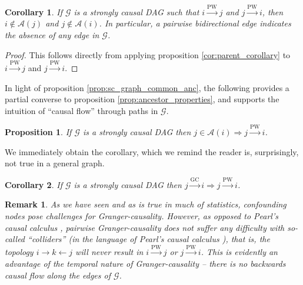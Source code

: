 \documentclass{statsoc}
\def\gc{\overset{\text{GC}}{\rightarrow}}  %
\def\pwgc{\overset{\text{PW}}{\rightarrow}}  %
\def\gcg{\mathcal{G}}  %
\newcommand{\pa}[1]{pa(#1)}  %
\newcommand{\anc}[1]{\mathcal{A}(#1)}  %
\newtheorem{corollary}{Corollary}
\newtheorem{proposition}{Proposition}
\newtheorem{remark}{Remark}
\begin{document}
\begin{corollary}
  \label{cor:bidirectional_edge}
  If $\gcg$ is a strongly causal DAG such that $i \pwgc j$ and
  $j \pwgc i$, then $i \not\in \anc{j}$ and $j \not\in \anc{i}$.  In
  particular, a pairwise bidirectional edge indicates the absence of
  any edge in $\gcg$.
\end{corollary}
\begin{proof}
  This follows directly from applying proposition
  \ref{cor:parent_corollary} to $i \pwgc j$ and $j \pwgc i$.
\end{proof}

In light of proposition \ref{prop:sc_graph_common_anc}, the following
provides a partial converse to proposition
\ref{prop:ancestor_properties}, and supports the intuition of ``causal
flow'' through paths in $\gcg$.

\begin{proposition}
  \label{prop:pwgc_anc}
  If $\gcg$ is a strongly causal DAG then $j \in \anc{i} \Rightarrow j \pwgc i$.
\end{proposition}

We immediately obtain the corollary, which we remind the reader is,
surprisingly, not true in a general graph.

\begin{corollary}
  \label{cor:gc_implies_pwgc}
  If $\gcg$ is a strongly causal DAG then $j \gc i \Rightarrow j \pwgc i$.
\end{corollary}

\begin{remark}
  As we have seen and as is true in much of statistics, confounding
  nodes pose challenges for Granger-causality.  However, as opposed to
  Pearl's causal calculus \cite{pearl2000art}, pairwise
  Granger-causality does not suffer any difficulty with so-called
  ``colliders'' (in the language of Pearl's causal calculus
  \cite{pearl2009causality}), that is, the topology
  $i \rightarrow k \leftarrow j$ will never result in $i \pwgc j$ or
  $j \pwgc i$.  This is evidently an advantage of the
  \textit{temporal} nature of Granger-causality -- there is no
  backwards causal flow along the edges of $\gcg$.
\end{remark}
\end{document}

